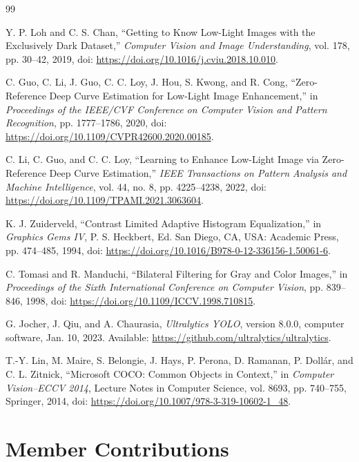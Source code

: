 \documentclass[11pt,a4paper]{article}
\begin{document}
\begin{thebibliography}{99}

Y. P. Loh and C. S. Chan,
``Getting to Know Low-Light Images with the Exclusively Dark Dataset,''
\emph{Computer Vision and Image Understanding}, vol. 178, pp. 30--42, 2019,
doi: \url{https://doi.org/10.1016/j.cviu.2018.10.010}.

C. Guo, C. Li, J. Guo, C. C. Loy, J. Hou, S. Kwong, and R. Cong,
``Zero-Reference Deep Curve Estimation for Low-Light Image Enhancement,''
in \emph{Proceedings of the IEEE/CVF Conference on Computer Vision and Pattern
Recognition}, pp. 1777--1786, 2020,
doi: \url{https://doi.org/10.1109/CVPR42600.2020.00185}.

C. Li, C. Guo, and C. C. Loy,
``Learning to Enhance Low-Light Image via Zero-Reference Deep Curve
Estimation,'' \emph{IEEE Transactions on Pattern Analysis and Machine
Intelligence}, vol. 44, no. 8, pp. 4225--4238, 2022,
doi: \url{https://doi.org/10.1109/TPAMI.2021.3063604}.

K. J. Zuiderveld,
``Contrast Limited Adaptive Histogram Equalization,'' in
\emph{Graphics Gems IV}, P. S. Heckbert, Ed. San Diego, CA, USA: Academic
Press, pp. 474--485, 1994,
doi: \url{https://doi.org/10.1016/B978-0-12-336156-1.50061-6}.

C. Tomasi and R. Manduchi,
``Bilateral Filtering for Gray and Color Images,'' in
\emph{Proceedings of the Sixth International Conference on Computer Vision},
pp. 839--846, 1998,
doi: \url{https://doi.org/10.1109/ICCV.1998.710815}.

G. Jocher, J. Qiu, and A. Chaurasia,
\emph{Ultralytics YOLO}, version 8.0.0, computer software, Jan. 10, 2023.
Available: \url{https://github.com/ultralytics/ultralytics}.

T.-Y. Lin, M. Maire, S. Belongie, J. Hays, P. Perona, D. Ramanan,
P. Doll\'ar, and C. L. Zitnick,
``Microsoft COCO: Common Objects in Context,'' in
\emph{Computer Vision--ECCV 2014}, Lecture Notes in Computer Science,
vol. 8693, pp. 740--755, Springer, 2014,
doi: \url{https://doi.org/10.1007/978-3-319-10602-1_48}.

\end{thebibliography}

\appendix

\section{Member Contributions}
\end{document}
